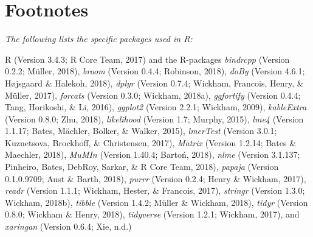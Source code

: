 \documentclass[man]{apa6}
\theoremstyle{definition}
\theoremstyle{definition}
\theoremstyle{definition}
\theoremstyle{remark}
\begin{document}
\endgroup

\newpage

\section{Footnotes}\label{footnotes}

\emph{The following lists the specific packages used in R:}

R (Version 3.4.3; R Core Team, 2017) and the R-packages \emph{bindrcpp}
(Version 0.2.2; Müller, 2018), \emph{broom} (Version 0.4.4; Robinson,
2018), \emph{doBy} (Version 4.6.1; Højsgaard \& Halekoh, 2018),
\emph{dplyr} (Version 0.7.4; Wickham, Francois, Henry, \& Müller, 2017),
\emph{forcats} (Version 0.3.0; Wickham, 2018a), \emph{ggfortify}
(Version 0.4.4; Tang, Horikoshi, \& Li, 2016), \emph{ggplot2} (Version
2.2.1; Wickham, 2009), \emph{kableExtra} (Version 0.8.0; Zhu, 2018),
\emph{likelihood} (Version 1.7; Murphy, 2015), \emph{lme4} (Version
1.1.17; Bates, Mächler, Bolker, \& Walker, 2015), \emph{lmerTest}
(Version 3.0.1; Kuznetsova, Brockhoff, \& Christensen, 2017),
\emph{Matrix} (Version 1.2.14; Bates \& Maechler, 2018), \emph{MuMIn}
(Version 1.40.4; Bartoń, 2018), \emph{nlme} (Version 3.1.137; Pinheiro,
Bates, DebRoy, Sarkar, \& R Core Team, 2018), \emph{papaja} (Version
0.1.0.9709; Aust \& Barth, 2018), \emph{purrr} (Version 0.2.4; Henry \&
Wickham, 2017), \emph{readr} (Version 1.1.1; Wickham, Hester, \&
Francois, 2017), \emph{stringr} (Version 1.3.0; Wickham, 2018b),
\emph{tibble} (Version 1.4.2; Müller \& Wickham, 2018), \emph{tidyr}
(Version 0.8.0; Wickham \& Henry, 2018), \emph{tidyverse} (Version
1.2.1; Wickham, 2017), and \emph{xaringan} (Version 0.6.4; Xie, n.d.)
\end{document}
